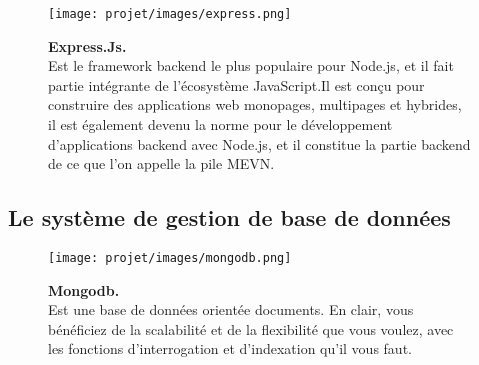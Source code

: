 \begin{figure}[H]
    \centering
    \begin{minipage}[c]{0.3\textwidth}
        \texttt{[image: projet/images/express.png]}
    \end{minipage}
    \hspace{1cm}
    \begin{minipage}[c]{0.6\textwidth}
        \textbf{Express.Js.}\\[0.5em]
     Est le framework backend le plus populaire pour Node.js, et il fait partie intégrante de l’écosystème JavaScript.Il est conçu pour construire des applications web monopages, multipages et hybrides, il est également devenu la norme pour le développement d’applications backend avec Node.js, et il constitue la partie backend de ce que l’on appelle la pile MEVN. \cite{ref14}
    \end{minipage}
\end{figure}
\subsection{Le système de gestion de base de données}
\begin{figure}[H]
    \centering
    \begin{minipage}[c]{0.3\textwidth}
        \texttt{[image: projet/images/mongodb.png]}
    \end{minipage}
    \hspace{1cm}
    \begin{minipage}[c]{0.6\textwidth}
        \textbf{Mongodb.}\\[0.5em]
     Est une base de données orientée documents. En clair, vous bénéficiez de la scalabilité et de la flexibilité que vous voulez, avec les fonctions d’interrogation et d’indexation qu’il vous faut. \cite{ref15}
    \end{minipage}
\end{figure}
